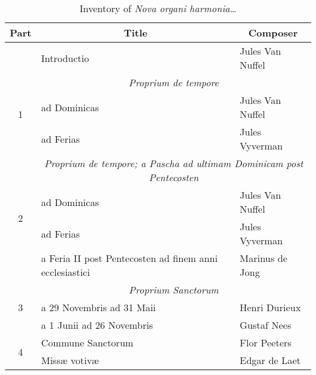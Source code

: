 \begin{table}[ht]
\centering
\footnotesize
\caption{Inventory of \emph{Nova organi harmonia}\ldots}
\label{tab:noh}
\begin{tabular}{@{}cll@{}}
\toprule
Part                 & \multicolumn{1}{c}{Title}                                              & \multicolumn{1}{c}{Composer} \\ \midrule
\multicolumn{1}{l}{} & Introductio                                                            & Jules Van Nuffel             \\ \midrule
\multirow{3}{*}{1}   & \multicolumn{2}{c}{\textit{Proprium de tempore}}                                                      \\
                     & ad Dominicas                                                           & Jules Van Nuffel             \\
                     & ad Ferias                                                              & Jules Vyverman               \\ \midrule
\multirow{4}{*}{2}   & \multicolumn{2}{c}{\textit{Proprium de tempore; a Pascha ad ultimam Dominicam post Pentecosten}}     \\
                     & ad Dominicas                                                           & Jules Van Nuffel             \\
                     & ad Ferias                                                              & Jules Vyverman               \\
                     & a Feria II post Pentecosten ad finem anni ecclesiastici                & Marinus de Jong              \\ \midrule
\multirow{3}{*}{3}   & \multicolumn{2}{c}{\textit{Proprium Sanctorum}}                                                       \\
                     & a 29 Novembris ad 31 Maii                                              & Henri Durieux                \\
                     & a 1 Junii ad 26 Novembris                                              & Gustaf Nees                  \\ \midrule
\multirow{3}{*}{4}   & Commune Sanctorum                                                      & Flor Peeters                 \\
                     & Miss\ae{} votiv\ae{}                                                   & Edgar de Laet                \\

\end{tabular}
\end{table}
